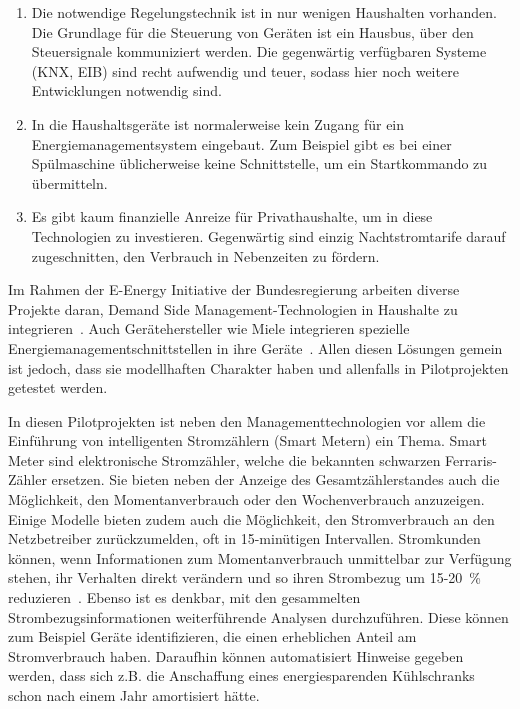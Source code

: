 \documentclass[12pt,BCOR=8.5mm]{scrartcl}
\begin{document}
\begin{enumerate}
  \item Die notwendige Regelungstechnik ist in nur wenigen Haushalten
    vorhanden. Die Grundlage für die Steuerung von Geräten ist ein
    Hausbus, über den Steuersignale kommuniziert werden. Die gegenwärtig
    verfügbaren Systeme (KNX, EIB) sind recht aufwendig und teuer,
    sodass hier noch weitere Entwicklungen notwendig sind.
  \item In die Haushaltsgeräte ist normalerweise kein Zugang für ein
    Energiemanagementsystem eingebaut. Zum Beispiel gibt es bei einer
    Spülmaschine üblicherweise keine Schnittstelle, um ein Startkommando
    zu übermitteln.
  \item Es gibt kaum finanzielle Anreize für Privathaushalte, um in
    diese Technologien zu investieren. Gegenwärtig sind einzig
    Nachtstromtarife darauf zugeschnitten, den Verbrauch in Nebenzeiten
    zu fördern.
\end{enumerate}


Im Rahmen der E-Energy Initiative der Bundesregierung arbeiten diverse
Projekte daran, Demand Side Management-Technologien in Haushalte zu
integrieren~\cite{web:e-energy}. Auch Gerätehersteller wie Miele
integrieren spezielle Energiemanagementschnittstellen in ihre
Geräte~\cite{miele10ifapresse}. Allen diesen Lösungen gemein ist jedoch,
dass sie modellhaften Charakter haben und allenfalls in Pilotprojekten
getestet werden.

In diesen Pilotprojekten ist neben den Managementtechnologien vor allem
die Einführung von intelligenten Stromzählern (Smart Metern) ein Thema.
Smart Meter sind elektronische Stromzähler, welche die bekannten
schwarzen Ferraris-Zähler ersetzen. Sie bieten neben der Anzeige des
Gesamtzählerstandes auch die Möglichkeit, den Momentanverbrauch oder den
Wochenverbrauch anzuzeigen. Einige Modelle bieten zudem auch die
Möglichkeit, den Stromverbrauch an den Netzbetreiber zurückzumelden, oft
in 15-minütigen Intervallen. Stromkunden können, wenn
Informationen zum Momentanverbrauch unmittelbar zur Verfügung stehen,
ihr Verhalten direkt verändern und so ihren Strombezug um 15-20~\%
reduzieren~\cite{geller2010smartgrid}. Ebenso ist es denkbar, mit den
gesammelten Strombezugsinformationen weiterführende Analysen
durchzuführen. Diese können zum Beispiel Geräte identifizieren, die
einen erheblichen Anteil am Stromverbrauch haben. Daraufhin können
automatisiert Hinweise gegeben werden, dass sich z.B. die Anschaffung
eines energiesparenden Kühlschranks schon nach einem Jahr amortisiert
hätte.
\end{document}
